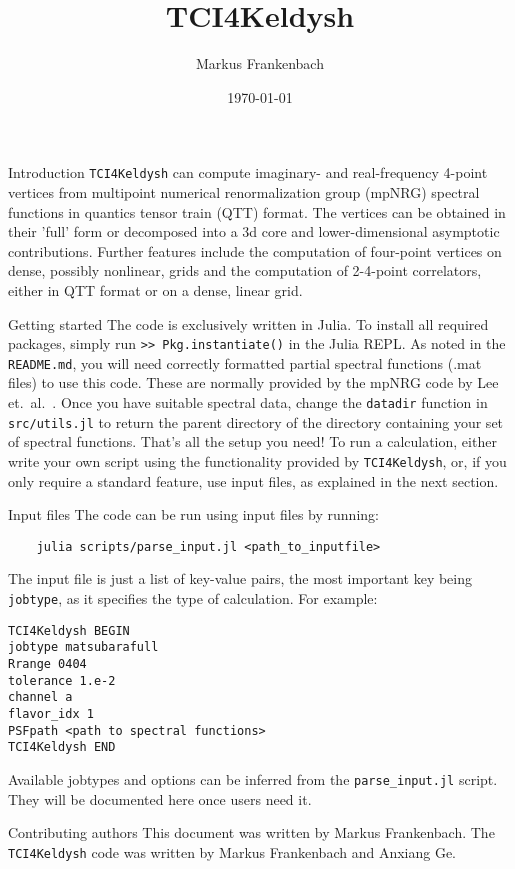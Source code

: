 \documentclass[12pt]{article}
\title{TCI4Keldysh}
\author{Markus Frankenbach}
\date{\today}
\begin{document}
\maketitle

\begin{section}{Introduction}
\texttt{TCI4Keldysh} can compute imaginary- and real-frequency 4-point vertices from multipoint numerical renormalization group (mpNRG) spectral functions in quantics tensor train (QTT) format.
The vertices can be obtained in their 'full' form or decomposed into a 3d core and lower-dimensional asymptotic contributions.
Further features include the computation of four-point vertices on dense, possibly nonlinear, grids and the computation of 2-4-point correlators, either
in QTT format or on a dense, linear grid.
\end{section}

\begin{section}{Getting started}
The code is exclusively written in Julia. To install all required packages,
simply run \texttt{>> Pkg.instantiate()} in the Julia REPL.
As noted in the \texttt{README.md}, you will need correctly formatted partial spectral functions (.mat files) to use this code.
These are normally provided by the mpNRG code by Lee et.~al.\ \cite{Lee2021}.
Once you have suitable spectral data, change the \texttt{datadir} function in \texttt{src/utils.jl} to
return the parent directory of the directory containing your set of spectral functions.
That's all the setup you need! To run a calculation, either write your own script using
the functionality provided by \texttt{TCI4Keldysh}, or, if you only require a standard feature,
use input files, as explained in the next section.
\end{section}

\begin{section}{Input files}
The code can be run using input files by running:
\begin{verbatim}
    julia scripts/parse_input.jl <path_to_inputfile>
\end{verbatim}
The input file is just a list of key-value pairs, the most important key being
\texttt{jobtype}, as it specifies the type of calculation. For example:
\begin{verbatim}
TCI4Keldysh BEGIN
jobtype matsubarafull
Rrange 0404
tolerance 1.e-2
channel a
flavor_idx 1
PSFpath <path to spectral functions>
TCI4Keldysh END
\end{verbatim}
Available jobtypes and options can be inferred from the \texttt{parse\_input.jl} script.
They will be documented here once users need it.
\end{section}

\begin{section}{Contributing authors}
This document was written by Markus Frankenbach. The \texttt{TCI4Keldysh} code was
written by Markus Frankenbach and Anxiang Ge.
\end{section}

\nocite{*}


\end{document}
